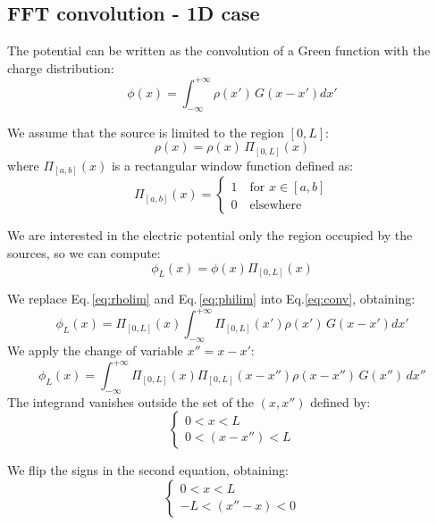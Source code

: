 \subsection{FFT convolution - 1D case}
The potential can be written as the convolution of a Green function with the charge distribution:
\begin{equation}
\phi(x) = \int_{-\infty}^{+\infty} \rho(x')\,G(x-x') dx'
\label{eq:conv}
\end{equation}

We assume that the source is limited to the region  $[0, L]$:
\begin{equation}
\rho(x) = \rho(x)\,\Pi_{[0,L]}\left(x\right)
\label{eq:rholim}
\end{equation}
where $\Pi_{[a,b]}(x)$ is a rectangular window function defined as:
\begin{equation}
\Pi_{[a,b]}(x) = 
\begin{cases}
1\quad\text{for } x \in [a, b]\\
0\quad\text{elsewhere}
\end{cases}
\end{equation}

We are interested in the electric potential only the region occupied by the sources, so we can compute:
\begin{equation}
\phi_L(x) = \phi(x) \Pi_{[0, L]}\left(x\right)
\label{eq:philim}
\end{equation}

We replace Eq.\,\eqref{eq:rholim} and Eq.\,\eqref{eq:philim} into Eq.\eqref{eq:conv}, obtaining:
\begin{equation}
\phi_L(x) = \Pi_{[0,L]}\left( x\right)
\int_{-\infty}^{+\infty} 
\Pi_{[0,L]}\left(x'\right)
\rho(x')\,G(x-x') dx'
\end{equation}
We apply the change of variable $x'' = x - x'$:
\begin{equation}
\phi_L(x) = 
\int_{-\infty}^{+\infty} 
\Pi_{[0,L]}\left({x}\right)
\Pi_{[0,L]}\left({x-x''}\right)
\rho(x-x'')\,G(x'') \,dx''
\label{eq:conv1}
\end{equation}
The integrand vanishes outside the set of the $(x, x'')$ defined by:
\begin{equation}
\begin{cases}
0 < x <{L}\\
0 < (x-x'') <{L}
\end{cases}
\end{equation}

We flip the signs in the second equation, obtaining:
\begin{equation}
\begin{cases}
0 < x <{L}\\
-L < (x''-x) <0
\end{cases}
\end{equation}

